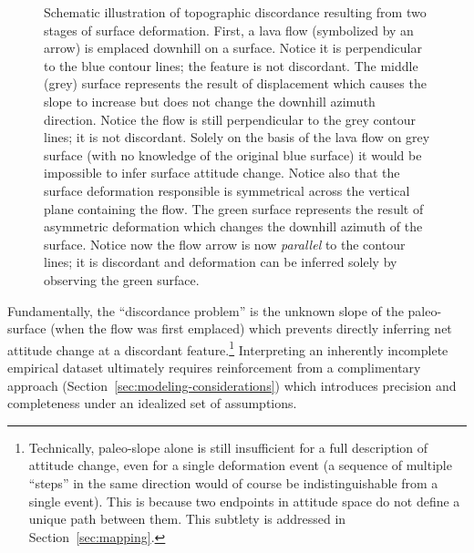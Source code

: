 
\begin{figure}
    \caption[Discordance \& attitude change]{Schematic illustration of topographic discordance resulting from two stages of surface deformation. First, a lava flow (symbolized by an arrow) is emplaced downhill on a surface. Notice it is perpendicular to the blue contour lines; the feature is not discordant. The middle (grey) surface represents the result of displacement which causes the slope to increase but does not change the downhill azimuth direction. Notice the flow is still perpendicular to the grey contour lines; it is not discordant. Solely on the basis of the lava flow on grey surface (with no knowledge of the original blue surface) it would be impossible to infer surface attitude change. Notice also that the surface deformation responsible is symmetrical across the vertical plane containing the flow. The green surface represents the result of asymmetric deformation which changes the downhill azimuth of the surface. Notice now the flow arrow is now \emph{parallel} to the contour lines; it is discordant and deformation can be inferred solely by observing the green surface.}%
    \label{fig:discordance-concept}
\end{figure}

Fundamentally, the ``discordance problem'' is the unknown slope of the paleo-surface (when the flow was first emplaced) which prevents directly inferring net attitude change at a discordant feature.\footnote{Technically, paleo-slope alone is still insufficient for a full description of attitude change, even for a single deformation event (a sequence of multiple ``steps'' in the same direction would of course be indistinguishable from a single event). This is because two endpoints in attitude space do not define a unique path between them. This subtlety is addressed in Section~\ref{sec:mapping}.} Interpreting an inherently incomplete empirical dataset ultimately requires reinforcement from a complimentary approach (Section~\ref{sec:modeling-considerations}) which introduces precision and completeness under an idealized set of assumptions.

